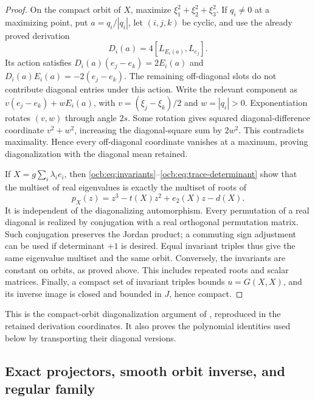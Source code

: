 \documentclass[11pt]{article}
\theoremstyle{definition}
\begin{document}
\begin{proof}
On the compact orbit of $X$, maximize
$\xi_1^2+\xi_2^2+\xi_3^2$. If $q_i\ne0$ at a maximizing point,
put $a=q_i/|q_i|$, let $(i,j,k)$ be cyclic, and use the already proved
derivation
\begin{equation}
 D_i(a)=4[L_{E_i(a)},L_{e_j}].
 \label{ocb:eq:derivation}\tag{OCB5}
\end{equation}
Its action satisfies
$D_i(a)(e_j-e_k)=2E_i(a)$ and
$D_i(a)E_i(a)=-2(e_j-e_k)$. The remaining off-diagonal slots do not
contribute diagonal entries under this action. Write the relevant
component as $v(e_j-e_k)+wE_i(a)$, with
$v=(\xi_j-\xi_k)/2$ and $w=|q_i|>0$. Exponentiation rotates $(v,w)$
through angle $2s$. Some rotation gives squared diagonal-difference
coordinate $v^2+w^2$, increasing the diagonal-square sum by $2w^2$.
This contradicts maximality. Hence every off-diagonal coordinate
vanishes at a maximum, proving diagonalization with the diagonal mean
retained.

If $X=g\sum_i\lambda_i e_i$, then
\eqref{ocb:eq:invariants}--\eqref{ocb:eq:trace-determinant} show that
the multiset of real eigenvalues is exactly the multiset of roots of
\begin{equation}
 p_X(z)=z^3-t(X)z^2+e_2(X)z-d(X).
 \label{ocb:eq:characteristic-polynomial}\tag{OCB6}
\end{equation}
It is independent of the diagonalizing automorphism. Every permutation
of a real diagonal is realized by conjugation with a real orthogonal
permutation matrix. Such conjugation preserves the Jordan product;
a commuting sign adjustment can be used if determinant $+1$ is
desired. Equal invariant triples thus give the same eigenvalue multiset
and the same orbit. Conversely, the invariants are constant on orbits,
as proved above. This includes repeated roots and scalar matrices.
Finally, a compact set of invariant triples bounds $u=G(X,X)$, and
its inverse image is closed and bounded in $J$, hence compact.
\end{proof}

This is the compact-orbit diagonalization argument of
\cite[Proposition~2.8.2, pp.~56--57]{Yokota2009}, reproduced in the
retained derivation coordinates. It also proves the polynomial identities
used below by transporting their diagonal versions.

\subsection{Exact projectors, smooth orbit inverse, and regular family}
\label{ocb:sec:regular-family}
\end{document}
